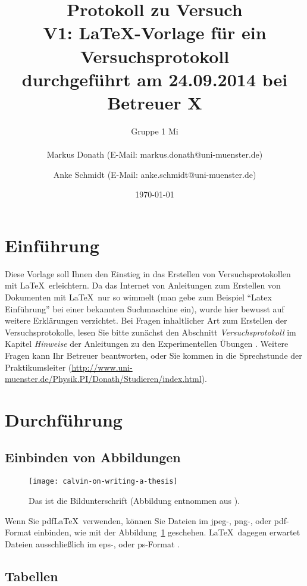 \documentclass[11pt,a4paper,titlepage]{article}
\title{{\Huge Protokoll zu Versuch\\ V1: \LaTeX-Vorlage für ein Versuchsprotokoll}\\ durchgeführt am 24.09.2014 bei Betreuer X}
\author{ {\Large Gruppe 1 Mi}\\ \\
 Markus Donath (E-Mail: markus.donath@uni-muenster.de)\\ \and 
 Anke Schmidt (E-Mail: anke.schmidt@uni-muenster.de)}
\date{\today}
\begin{document}
\maketitle

\tableofcontents

\newpage

\section{Einführung}

Diese Vorlage soll Ihnen den Einstieg in das Erstellen von Versuchsprotokollen mit \LaTeX\ erleichtern. Da das Internet von Anleitungen zum Erstellen von Dokumenten mit \LaTeX\ nur so wimmelt (man gebe zum Beispiel ``Latex Einführung'' bei einer bekannten Suchmaschine ein), wurde hier bewusst auf weitere Erklärungen verzichtet. Bei Fragen inhaltlicher Art zum Erstellen der Versuchsprotokolle, lesen Sie bitte zunächst den Abschnitt \emph{Versuchsprotokoll} im Kapitel \emph{Hinweise} der Anleitungen zu den Experimentellen Übungen \cite{anleitung}. Weitere Fragen kann Ihr Betreuer beantworten, oder Sie kommen in die Sprechstunde der Praktikumsleiter (\url{http://www.uni-muenster.de/Physik.PI/Donath/Studieren/index.html}).

\section{Durchführung}

\subsection{Einbinden von Abbildungen}

\begin{figure}[htb]
  \centering
    \texttt{[image: calvin-on-writing-a-thesis]} %
  \caption{Das ist die Bildunterschrift (Abbildung entnommen aus \cite{billwatterson}).}\label{CandH}
\end{figure}

Wenn Sie pdf\LaTeX\ verwenden, können Sie Dateien im jpeg-, png-, oder pdf-Format einbinden, wie mit der Abbildung~\ref{CandH} geschehen. \LaTeX\ dagegen erwartet Dateien ausschließlich im eps-, oder ps-Format \cite{andyroberts}.

\subsection{Tabellen}
\end{document}

